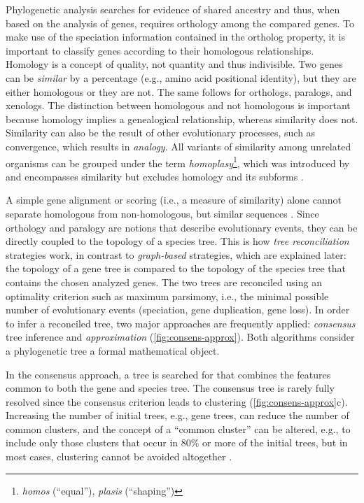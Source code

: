 \label{sec:orthology-howto}
Phylogenetic analysis searches for evidence of shared ancestry and thus, when
based on the analysis of genes, requires orthology among the compared genes. To
make use of the speciation information contained in the ortholog property, it is
important to classify genes according to their homologous relationships.
Homology is a concept of quality, not quantity \citep{reeck1987} and thus
indivisible. Two genes can be \emph{similar} by a percentage (e.g., amino acid
positional identity), but they are either homologous or they are not. The same
follows for orthologs, paralogs, and xenologs. The distinction between
homologous and not homologous is important because homology implies a
genealogical relationship, whereas similarity does not. Similarity can also be
the result of other evolutionary processes, such as convergence, which results
in \emph{analogy}. All variants of similarity among unrelated organisms can be
grouped under the term \emph{homoplasy}\footnote{\emph{homos} (``equal''),
\emph{plasis} (``shaping'')}, which was introduced by \citet{lankester1870} and
encompasses similarity but excludes homology and its subforms \citep{page1998}.

A simple gene alignment or scoring (i.e., a measure of similarity) alone cannot
separate homologous from non-homologous, but similar sequences
\citep{eisen1998}. Since orthology and paralogy are notions that describe
evolutionary events, they can be directly coupled to the topology of a species
tree. This is how \emph{tree reconciliation} strategies work, in contrast to
\emph{graph-based} strategies, which are explained later: the topology of a gene
tree is compared to the topology of the species tree that contains the chosen
analyzed genes. The two trees are reconciled using an optimality criterion such
as maximum parsimony, i.e., the minimal possible number of evolutionary events
(speciation, gene duplication, gene loss). In order to infer a reconciled tree,
two major approaches are frequently applied: \emph{consensus} tree inference and
\emph{approximation} (\autoref{fig:consens-approx}). Both algorithms consider a
phylogenetic tree a formal mathematical object.

In the consensus approach, a tree is searched for that combines the features
common to both the gene and species tree. The consensus tree is rarely fully
resolved since the consensus criterion leads to clustering
(\autoref{fig:consens-approx}c). Increasing the number of initial trees, e.g.,
gene trees, can reduce the number of common clusters, and the concept of a
``common cluster'' can be altered, e.g., to include only those clusters that
occur in 80\% or more of the initial trees, but in most cases, clustering cannot
be avoided altogether \citep{mirkin1995}.

